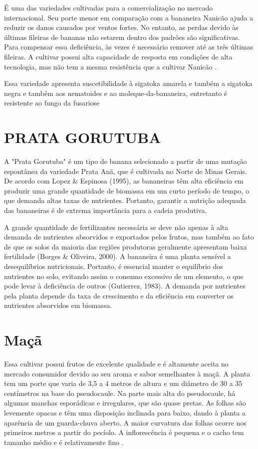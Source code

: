 É uma das variedades cultivadas para a comercialização no mercado internacional. Seu porte menor em comparação com a bananeira Nanicão ajuda a reduzir os danos causados por ventos fortes. No entanto, as perdas devido às últimas fileiras de bananas não estarem dentro dos padrões são significativas. Para compensar essa deficiência, às vezes é necessário remover até as três últimas fileiras. A cultivar possui alta capacidade de resposta em condições de alta tecnologia, mas não tem a mesma resistência que a cultivar Nanicão \cite{cultivodebananeira}.

Essa variedade apresenta suscetibilidade à sigatoka amarela \cite {rocha2008epidemiologia, cultivodebananeira} e também a sigatoka negra e também aos nematoides e ao moleque-da-bananeira, entretanto é resistente ao fungo da fusariose \cite{cultivodebananeira}

\section{PRATA GORUTUBA}
A "Prata Gorutuba" é um tipo de banana selecionado a partir de uma mutação espontânea da variedade Prata Anã, que é cultivada no Norte de Minas Gerais. De acordo com Lopez \& Espinosa (1995), as bananeiras têm alta eficiência em produzir uma grande quantidade de biomassa em um curto período de tempo, o que demanda altas taxas de nutrientes. Portanto, garantir a nutrição adequada das bananeiras é de extrema importância para a cadeia produtiva.

A grande quantidade de fertilizantes necessária se deve não apenas à alta demanda de nutrientes absorvidos e exportados pelos frutos, mas também ao fato de que os solos da maioria das regiões produtoras geralmente apresentam baixa fertilidade (Borges \& Oliveira, 2000). A bananeira é uma planta sensível a desequilíbrios nutricionais. Portanto, é essencial manter o equilíbrio dos nutrientes no solo, evitando assim o consumo excessivo de um elemento, o que pode levar à deficiência de outros (Gutierrez, 1983). A demanda por nutrientes pela planta depende da taxa de crescimento e da eficiência em converter os nutrientes absorvidos em biomassa.

\section{Maçã}
Essa cultivar possui frutos de excelente qualidade e é altamente aceita no mercado consumidor devido ao seu aroma e sabor semelhantes à maçã. A planta tem um porte que varia de 3,5 a 4 metros de altura e um diâmetro de 30 a 35 centímetros na base do pseudocaule. Na parte mais alta do pseudocaule, há algumas manchas esporádicas e irregulares, que são quase pretas. As folhas são levemente opacas e têm uma disposição inclinada para baixo, dando à planta a aparência de um guarda-chuva aberto. A maior curvatura das folhas ocorre nos primeiros metros a partir do pecíolo. A inflorescência é pequena e o cacho tem tamanho médio e é relativamente fino \cite{cultivodebananeira}.

